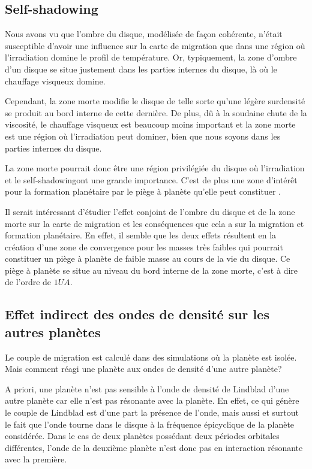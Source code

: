 \subsection{Self-shadowing}
Nous avons vu  que l'ombre du disque, modélisée de façon cohérente, n'était susceptible d'avoir une influence sur la carte de migration que dans une région où l'irradiation domine le profil de température. Or, typiquement, la zone d'ombre d'un disque se situe justement dans les parties internes du disque, là où le chauffage visqueux domine. 

Cependant, la zone morte modifie le disque de telle sorte qu'une légère surdensité se produit au bord interne de cette dernière. De plus, dû à la soudaine chute de la viscosité, le chauffage visqueux est beaucoup moins important et la zone morte est une région où l'irradiation peut dominer, bien que nous soyons dans les parties internes du disque. 

La zone morte pourrait donc être une région privilégiée du disque où l'irradiation et le \og self-shadowing\fg ont une grande importance. C'est de plus une zone d'intérêt pour la formation planétaire par le piège à planète qu'elle peut constituer \citep{hasegawa2011origin}.

Il serait intéressant d'étudier l'effet conjoint de l'ombre du disque et de la zone morte sur la carte de migration et les conséquences que cela a sur la migration et formation planétaire. En effet, il semble que les deux effets résultent en la création d'une zone de convergence pour les masses très faibles  qui pourrait constituer un piège à planète de faible masse au cours de la vie du disque. Ce piège à planète se situe au niveau du bord interne de la zone morte, c'est à dire de l'ordre de $1\unit{UA}$.

\subsection{Effet indirect des ondes de densité sur les autres planètes}
Le couple de migration est calculé dans des simulations où la planète est isolée. Mais comment réagi une planète aux ondes de densité d'une autre planète? 

A priori, une planète n'est pas sensible à l'onde de densité de Lindblad d'une autre planète car elle n'est pas résonante avec la planète. En effet, ce qui génère le couple de Lindblad est d'une part la présence de l'onde, mais aussi et surtout le fait que l'onde tourne dans le disque à la fréquence épicyclique de la planète considérée. Dans le cas de deux planètes possédant deux périodes orbitales différentes, l'onde de la deuxième planète n'est donc pas en interaction résonante avec la première. 

